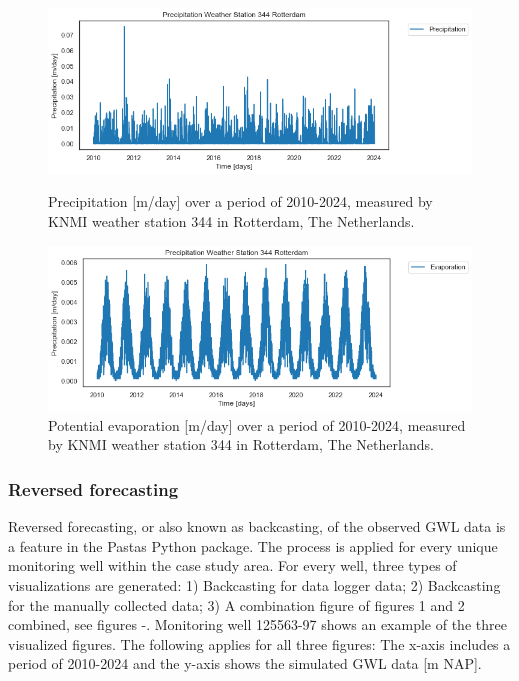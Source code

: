 \begin{figure}[htbp]
    \centering
    \begin{minipage}{0.45\textwidth}
        \centering
        \includegraphics[width=\linewidth]{frontmatter/Heijplaat-fig/P.png}
        \caption{Precipitation [m/day] over a period of 2010-2024, measured by KNMI weather station 344 in Rotterdam, The Netherlands.}
        \label{P}
    \end{minipage}\hfill
    \begin{minipage}{0.45\textwidth}
        \centering
        \includegraphics[width=\linewidth]{frontmatter/Heijplaat-fig/ET.png}
        \caption{Potential evaporation [m/day] over a period of 2010-2024, measured by KNMI weather station 344 in Rotterdam, The Netherlands.}
        \label{ET}
    \end{minipage}
\end{figure}
\newpage
\subsubsection{Reversed forecasting}
Reversed forecasting, or also known as backcasting, of the observed GWL data is a feature in the Pastas Python package. The process is applied for every unique monitoring well within the case study area. For every well, three types of visualizations are generated: 1) Backcasting for data logger data; 2) Backcasting for the manually collected data; 3) A combination figure of figures 1 and 2 combined, see figures -. Monitoring well 125563-97 shows an example of the three visualized figures. The following applies for all three figures: The x-axis includes a period of 2010-2024 and the y-axis shows the simulated GWL data [m NAP].

